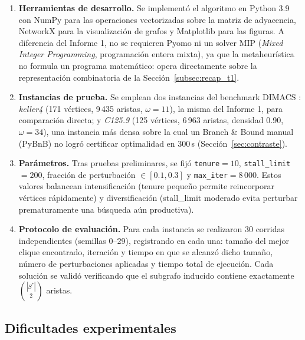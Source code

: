 \begin{enumerate}
    \item \textbf{Herramientas de desarrollo.} Se implementó el algoritmo en Python 3.9 con NumPy \parencite{numpy2020} para las operaciones vectorizadas sobre la matriz de adyacencia, NetworkX \parencite{networkx2008} para la visualización de grafos y Matplotlib \parencite{matplotlib2007} para las figuras. A diferencia del Informe 1, no se requieren Pyomo ni un solver MIP (\textit{Mixed Integer Programming}, programación entera mixta), ya que la metaheurística no formula un programa matemático: opera directamente sobre la representación combinatoria de la Sección~\ref{subsec:recap_t1}.

    \item \textbf{Instancias de prueba.} Se emplean dos instancias del benchmark DIMACS \parencite{dimacs1993, mascia_dimacs}: \textit{keller4} (171 vértices, 9\,435 aristas, $\omega=11$), la misma del Informe 1, para comparación directa; y \textit{C125.9} (125 vértices, 6\,963 aristas, densidad 0.90, $\omega=34$), una instancia más densa sobre la cual un Branch \& Bound manual (PyBnB) no logró certificar optimalidad en 300\,s (Sección~\ref{sec:contraste}).

    \item \textbf{Parámetros.} Tras pruebas preliminares, se fijó \texttt{tenure}$=10$, \texttt{stall\_limit}$=200$, fracción de perturbación $\in[0.1,0.3]$ y \texttt{max\_iter}$=8\,000$. Estos valores balancean intensificación (tenure pequeño permite reincorporar vértices rápidamente) y diversificación (stall\_limit moderado evita perturbar prematuramente una búsqueda aún productiva).

    \item \textbf{Protocolo de evaluación.} Para cada instancia se realizaron 30 corridas independientes (semillas 0--29), registrando en cada una: tamaño del mejor clique encontrado, iteración y tiempo en que se alcanzó dicho tamaño, número de perturbaciones aplicadas y tiempo total de ejecución. Cada solución se validó verificando que el subgrafo inducido contiene exactamente $\binom{|S^*|}{2}$ aristas.
\end{enumerate}

\subsection{Dificultades experimentales}

